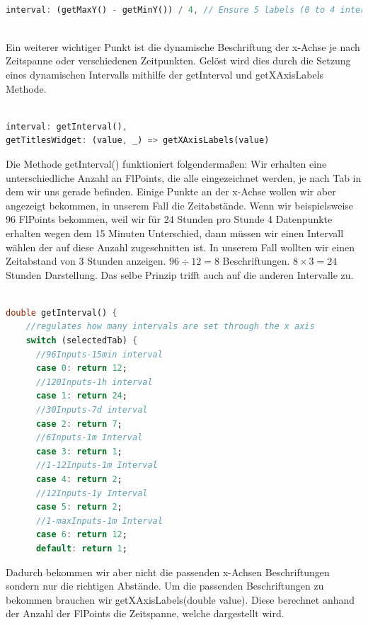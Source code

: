\documentclass[11pt]{scrartcl}
\begin{document}
\begin{lstlisting}[language=Dart]

interval: (getMaxY() - getMinY()) / 4, // Ensure 5 labels (0 to 4 intervals)
    
\end{lstlisting}

Ein weiterer wichtiger Punkt ist die dynamische Beschriftung der x-Achse je nach Zeitspanne oder verschiedenen Zeitpunkten. Gelöst wird dies durch die Setzung eines dynamischen Intervalls mithilfe der getInterval und getXAxisLabels Methode.

\newpage

\begin{lstlisting}[language=Dart]

interval: getInterval(),
getTitlesWidget: (value, _) => getXAxisLabels(value)

\end{lstlisting}

Die Methode getInterval() funktioniert folgendermaßen: Wir erhalten eine unterschiedliche Anzahl an FlPoints, die alle eingezeichnet werden, je nach Tab in dem wir uns gerade befinden. Einige Punkte an der x-Achse wollen wir aber angezeigt bekommen, in unserem Fall die Zeitabstände. Wenn wir beispielsweise 96 FlPoints bekommen, weil wir für 24 Stunden pro Stunde 4 Datenpunkte erhalten wegen dem 15 Minuten Unterschied, dann müssen wir einen Intervall wählen der auf diese Anzahl zugeschnitten ist. In unserem Fall wollten wir einen Zeitabstand von 3 Stunden anzeigen. $96 \div 12 = 8$ Beschriftungen. $8 \times 3 = 24$ Stunden Darstellung. Das selbe Prinzip trifft auch auf die anderen Intervalle zu.

\begin{lstlisting}[language=Dart]

double getInterval() {
    //regulates how many intervals are set through the x axis
    switch (selectedTab) {
      //96Inputs-15min interval
      case 0: return 12;
      //120Inputs-1h interval
      case 1: return 24;
      //30Inputs-7d interval
      case 2: return 7;
      //6Inputs-1m Interval
      case 3: return 1;
      //1-12Inputs-1m Interval
      case 4: return 2;
      //12Inputs-1y Interval
      case 5: return 2;
      //1-maxInputs-1m Interval
      case 6: return 12;
      default: return 1;
\end{lstlisting}

Dadurch bekommen wir aber nicht die passenden x-Achsen Beschriftungen sondern nur die richtigen Abstände. Um die passenden Beschriftungen zu bekommen brauchen wir getXAxisLabels(double value). Diese berechnet anhand der Anzahl der FlPoints die Zeitspanne, welche dargestellt wird.
\end{document}
